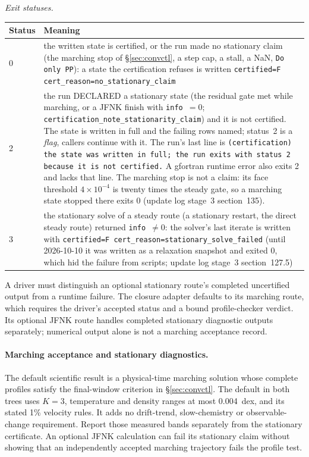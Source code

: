 \documentclass[english,a4paper]{my_memo}
\begin{document}
\emph{Exit statuses.}
\begin{center}\small
\begin{tabular}{@{}lp{}@{}}
\toprule
Status & Meaning \\
\midrule
0 & the written state is certified, or the run made no stationary claim (the
    marching stop of \S\ref{sec:convctl}, a step cap, a stall, a NaN,
    \texttt{Do only PP}): a state the certification refuses is written
    \texttt{certified=F cert\_reason=no\_stationary\_claim} \\
2 & the run DECLARED a stationary state (the residual gate met while
    marching, or a JFNK finish with \texttt{info}~$=0$;
    \texttt{certification\_note\_stationarity\_claim}) and it is not certified. The state is
    written in full and the failing rows named; status~2 is a \emph{flag},
    callers continue with it. The run's last line is
    \texttt{(certification) the state was written in full; the run exits with
    status 2 because it is not certified.} A gfortran runtime error also exits
    2 and lacks that line. The marching stop is not a claim: its face
    threshold $4\times10^{-4}$ is twenty times the steady gate, so a
    marching state stopped there exits 0 (update log stage~3 section~135). \\
3 & the stationary solve of a steady route (a stationary restart, the direct
    steady route) returned \texttt{info}~$\ne0$: the solver's last iterate is
    written with \texttt{certified=F cert\_reason=stationary\_solve\_failed}
    (until 2026-10-10 it was written as a relaxation snapshot and exited 0,
    which hid the failure from scripts; update log stage~3 section~127.5) \\
\bottomrule
\end{tabular}
\end{center}
A driver must distinguish an optional stationary route's completed
uncertified output from a runtime failure. The closure adapter defaults to
its marching route, which requires the driver's accepted status and a
bound profile-checker verdict. Its optional JFNK route handles completed
stationary diagnostic outputs separately; numerical output alone is not
a marching acceptance record.

\paragraph{Marching acceptance and stationary diagnostics.}
The default scientific result is a physical-time marching solution whose
complete profiles satisfy the final-window criterion in
\S\ref{sec:convctl}. The default in both trees uses $K=3$, temperature and
density ranges at most 0.004~dex, and its stated 1\% velocity rules.
It adds no drift-trend, slow-chemistry or observable-change requirement.
Report those measured bands separately from the stationary certificate.
An optional JFNK calculation can fail its stationary claim without showing
that an independently accepted marching trajectory fails the profile test.
\end{document}
